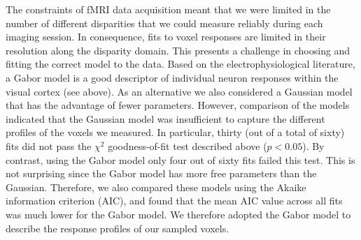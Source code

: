The constraints of fMRI data acquisition meant that we were limited in the number of different disparities that we could measure reliably during each imaging session. In consequence, fits to voxel responses are limited in their resolution along the disparity domain. This presents a challenge in choosing and fitting the correct model to the data. Based on the electrophysiological literature, a Gabor model is a good descriptor of individual neuron responses within the visual cortex (see above). As an alternative we also considered a Gaussian model that has the advantage of fewer parameters. However, comparison of the models indicated that the Gaussian model was insufficient to capture the different profiles of the voxels we measured. In particular, thirty (out of a total of sixty) fits did not pass the $\chi^2$ goodness-of-fit test described above ($p<0.05$). By contrast, using the Gabor model only four out of sixty fits failed this test. This is not surprising since the Gabor model has more free parameters than the Gaussian. Therefore, we also compared these models using the Akaike information criterion (AIC), and found that the mean AIC value across all fits was much lower for the Gabor model. We therefore adopted the Gabor model to describe the response profiles of our sampled voxels.

